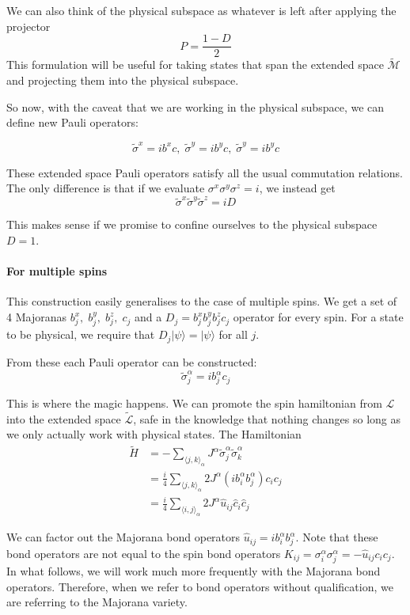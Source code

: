 We can also think of the physical subspace as whatever is left after applying the projector \[P  = \frac{1 - D}{2}\] This formulation will be useful for taking states that span the extended space \(\mathcal{\tilde{M}}\) and projecting them into the physical subspace.

So now, with the caveat that we are working in the physical subspace, we can define new Pauli operators:

\[\tilde{\sigma}^x = i b^x c,\; \tilde{\sigma}^y = i b^y c,\; \tilde{\sigma}^y = i b^y c\]

These extended space Pauli operators satisfy all the usual commutation relations. The only difference is that if we evaluate \(\sigma^x \sigma^y \sigma^z = i\), we instead get \[ \tilde{\sigma}^x\tilde{\sigma}^y\tilde{\sigma}^z = iD \]

This makes sense if we promise to confine ourselves to the physical subspace \(D = 1\).

\hypertarget{for-multiple-spins}{%
\paragraph{For multiple spins}\label{for-multiple-spins}}

This construction easily generalises to the case of multiple spins. We get a set of 4 Majoranas \(b^x_j,\; b^y_j,\;b^z_j,\; c_j\) and a \(D_j = b^x_jb^y_jb^z_jc_j\) operator for every spin. For a state to be physical, we require that \(D_j |\psi\rangle = |\psi\rangle\) for all \(j\).

From these each Pauli operator can be constructed: \[\tilde{\sigma}^\alpha_j = i b^\alpha_j c_j\]

This is where the magic happens. We can promote the spin hamiltonian from \(\mathcal{L}\) into the extended space \(\mathcal{\tilde{L}}\), safe in the knowledge that nothing changes so long as we only actually work with physical states. The Hamiltonian \[\begin{aligned}
\tilde{H} &=  - \sum_{\langle j,k\rangle_\alpha} J^{\alpha}\tilde{\sigma}_j^{\alpha}\tilde{\sigma}_k^{\alpha}\\
          &= \frac{i}{4} \sum_{\langle j,k\rangle_\alpha} 2J^{\alpha} (ib^\alpha_i b^\alpha_j) c_i c_j\\
          &=  \frac{i}{4} \sum_{\langle i,j\rangle_\alpha} 2J^{\alpha} \hat{u}_{ij} \hat{c}_i \hat{c}_j
\end{aligned}\]

We can factor out the Majorana bond operators \(\hat{u}_{ij} = i b^\alpha_i b^\alpha_j\). Note that these bond operators are not equal to the spin bond operators \(K_{ij} = \sigma^\alpha_i \sigma^\alpha_j = - \hat{u}_{ij} c_i c_j\). In what follows, we will work much more frequently with the Majorana bond operators. Therefore, when we refer to bond operators without qualification, we are referring to the Majorana variety.

